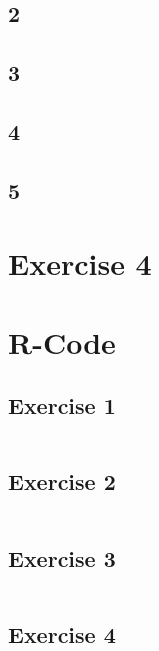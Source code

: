 \documentclass{article}
\begin{document}
    \subsection*{2}
    \subsection*{3}
    \subsection*{4}
    \subsection*{5}

  \section*{Exercise 4}
    
  \section{R-Code}
    \subsection{Exercise 1}\label{sec:RE1}
      \begin{lstlisting}[language=R]
      \end{lstlisting}
    \subsection{Exercise 2}\label{sec:RE2}
      \begin{lstlisting}[language=R]
      \end{lstlisting}
    \subsection{Exercise 3}\label{sec:RE3}
      \begin{lstlisting}[language=R]
      \end{lstlisting}
    \subsection{Exercise 4}\label{sec:RE4}
      \begin{lstlisting}[language=R]
      \end{lstlisting}
\end{document}
